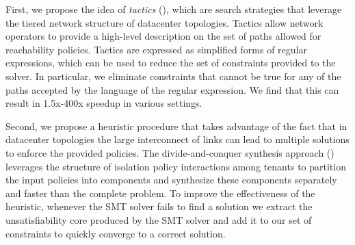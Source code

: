 First, we propose the idea of \emph{tactics} (),
which are search strategies that leverage the tiered network structure
of datacenter topologies.
Tactics allow network operators to provide a high-level description on
the set of paths allowed for reachability policies.  Tactics are
expressed as simplified forms of regular expressions, which can be
used to reduce the set of constraints provided to the solver.  In
particular, we eliminate constraints that cannot be true for any
of the paths accepted by the language of the regular expression. We
find that this can result in 1.5x-400x speedup in various settings.

Second, we propose a heuristic procedure that takes advantage of the fact that in 
datacenter topologies the large
interconnect of links can lead to multiple solutions 
to enforce the provided policies.  
The divide-and-conquer
synthesis approach () leverages the structure of
isolation policy interactions among tenants to partition the input
policies into components and synthesize these components separately and
faster than the complete problem. To improve the effectiveness of the
heuristic, whenever the SMT solver fails to find a solution we extract
the unsatisfiability core produced by the SMT solver and 
add it to our set of constraints to quickly converge to a correct solution.


